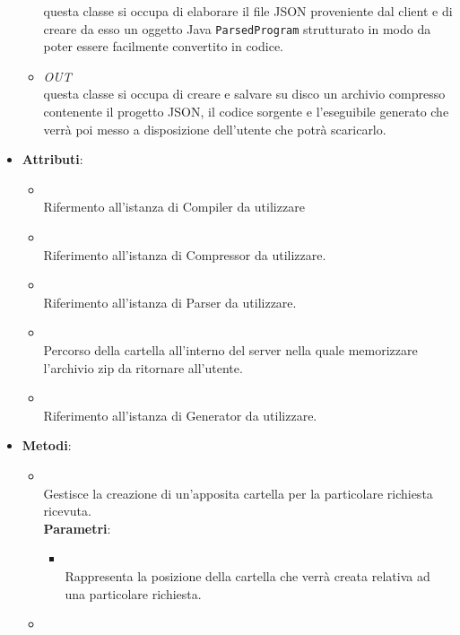 \begin{itemize}
\begin{itemize}
questa classe si occupa di elaborare il file JSON proveniente dal client e di creare da esso un oggetto Java \texttt{ParsedProgram} strutturato in modo da poter essere facilmente convertito in codice.
\item \textit{OUT} \hyperref[\nogloxy{swedesigner::server::utility::Compressor}]{}\\
questa classe si occupa di creare e salvare su disco un archivio compresso contenente il progetto JSON, il codice sorgente e l'eseguibile generato che verrà poi messo a disposizione dell'utente che potrà scaricarlo.
\end{itemize}
\item \textbf{Attributi}:
\begin{itemize}
\item {}
\\ Rifermento all'istanza di Compiler da utilizzare
\item {}
\\ Riferimento all'istanza di Compressor da utilizzare.
\item {}
\\ Riferimento all'istanza di Parser da utilizzare.
\item {}
\\ Percorso della cartella all'interno del server nella quale memorizzare l'archivio zip da ritornare all'utente.
\item {}
\\ Riferimento all'istanza di Generator da utilizzare.
\end{itemize}
\item \textbf{Metodi}:
\begin{itemize}
\item {}
\\ Gestisce la creazione di un'apposita cartella per la particolare richiesta ricevuta.
\\ \textbf{Parametri}:
\begin{itemize}
\item {}
\\ Rappresenta la posizione della cartella che verrà creata relativa ad una particolare richiesta.
\end{itemize}
\item {}


\end{itemize}
\end{itemize}
